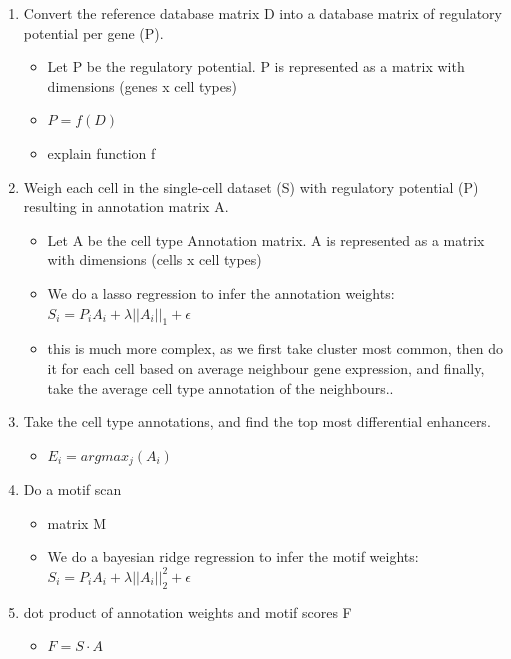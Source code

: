 \begin{enumerate}[label=(\Alph*)]
    \item Convert the reference database matrix D into a database matrix of regulatory potential per gene (P).
    \begin{itemize}
        \item Let P be the regulatory potential. P is represented as a matrix with dimensions (genes x cell types)
        \item $P = f(D)$
        \item explain function f
    \end{itemize}
    \item Weigh each cell in the single-cell dataset (S) with regulatory potential (P) resulting in annotation matrix A.
    \begin{itemize}
        \item Let A be the cell type Annotation matrix. A is represented as a matrix with dimensions (cells x cell types)
        \item We do a lasso regression to infer the annotation weights: $S_i = P_i A_i + \lambda ||A_i||_1 +\epsilon$
        \item this is much more complex, as we first take cluster most common, then do it for each cell based on average neighbour gene expression, and finally, take the average cell type annotation of the neighbours..
    \end{itemize}
    \item Take the cell type annotations, and find the top most differential enhancers.
    \begin{itemize}
        \item $E_i = argmax_j(A_i)$
    \end{itemize}
    \item Do a motif scan
    \begin{itemize}
        \item matrix M
        \item We do a bayesian ridge regression to infer the motif weights: $S_i = P_i A_i + \lambda ||A_i||_2^2 +\epsilon$
    \end{itemize}
    \item dot product of annotation weights and motif scores F
    \begin{itemize}
        \item $F = S \cdot A$
    \end{itemize}
\end{enumerate}

